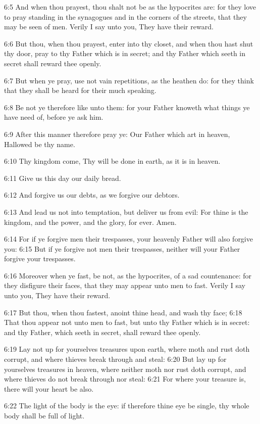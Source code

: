6:5 And when thou prayest, thou shalt not be as the hypocrites are:
for they love to pray standing in the synagogues and in the corners of
the streets, that they may be seen of men. Verily I say unto you, They
have their reward.

6:6 But thou, when thou prayest, enter into thy closet, and when thou
hast shut thy door, pray to thy Father which is in secret; and thy
Father which seeth in secret shall reward thee openly.

6:7 But when ye pray, use not vain repetitions, as the heathen do: for
they think that they shall be heard for their much speaking.

6:8 Be not ye therefore like unto them: for your Father knoweth what
things ye have need of, before ye ask him.

6:9 After this manner therefore pray ye: Our Father which art in
heaven, Hallowed be thy name.

6:10 Thy kingdom come, Thy will be done in earth, as it is in heaven.

6:11 Give us this day our daily bread.

6:12 And forgive us our debts, as we forgive our debtors.

6:13 And lead us not into temptation, but deliver us from evil: For
thine is the kingdom, and the power, and the glory, for ever. Amen.

6:14 For if ye forgive men their trespasses, your heavenly Father will
also forgive you: 6:15 But if ye forgive not men their trespasses,
neither will your Father forgive your trespasses.

6:16 Moreover when ye fast, be not, as the hypocrites, of a sad
countenance: for they disfigure their faces, that they may appear unto
men to fast. Verily I say unto you, They have their reward.

6:17 But thou, when thou fastest, anoint thine head, and wash thy
face; 6:18 That thou appear not unto men to fast, but unto thy Father
which is in secret: and thy Father, which seeth in secret, shall
reward thee openly.

6:19 Lay not up for yourselves treasures upon earth, where moth and
rust doth corrupt, and where thieves break through and steal: 6:20 But
lay up for yourselves treasures in heaven, where neither moth nor rust
doth corrupt, and where thieves do not break through nor steal: 6:21
For where your treasure is, there will your heart be also.

6:22 The light of the body is the eye: if therefore thine eye be
single, thy whole body shall be full of light.

